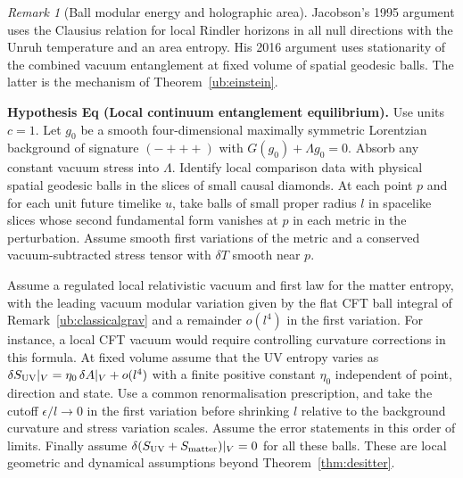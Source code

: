\documentclass[aps,pra,onecolumn,superscriptaddress,nofootinbib,10pt]{revtex4-2}
\theoremstyle{definition}
\theoremstyle{remark}
\newtheorem{remark}[theorem]{Remark}
\begin{document}
\begin{remark}[Ball modular energy and holographic area]
Jacobson's 1995 argument uses the Clausius relation for local Rindler
horizons in all null directions with the Unruh temperature and an
area entropy. His 2016 argument uses stationarity of the combined
vacuum entanglement at fixed volume of spatial geodesic balls.
The latter is the mechanism of Theorem~\ref{ub:einstein}.
\cite{n1-rt,ub:hrt,ub:flm,ub:faulkner,n1-jacobson,ub:jac16}
\end{remark}

\smallskip\noindent\textbf{Hypothesis Eq (Local continuum entanglement equilibrium).}\label{hyp:Eq}  Use units $c=1$. Let $g_0$ be a smooth four-dimensional maximally
symmetric Lorentzian background of signature $(-+++)$ with
$G(g_0)+\Lambda g_0=0$. Absorb any constant vacuum stress into
$\Lambda$. Identify local comparison data with physical spatial
geodesic balls in the slices of small causal diamonds. At each point
$p$ and for each unit future timelike $u$, take balls of small
proper radius $l$ in spacelike slices whose second fundamental form
vanishes at $p$ in each metric in the perturbation. Assume smooth
first variations of the metric and a conserved vacuum-subtracted
stress tensor with $\delta T$ smooth near $p$.

Assume a regulated local relativistic vacuum and first law for the
matter entropy, with the leading vacuum modular variation given by the
flat CFT ball integral of Remark~\ref{ub:classicalgrav} and a
remainder $o(l^4)$ in the first variation. For instance, a local CFT
vacuum would require controlling curvature corrections in this
formula. At fixed volume assume that the UV entropy varies as
$\delta S_{\rm UV}|_V=\eta_0\,\delta A|_V+o(l^4)$ with a finite
positive constant $\eta_0$ independent of point, direction and state.
Use a common renormalisation prescription, and take the cutoff
$\epsilon/l\to0$ in the first variation before shrinking $l$ relative
to the background curvature and stress variation scales.
Assume the error statements in this order of limits. Finally assume
$\delta(S_{\rm UV}+S_{\rm matter})|_V=0$ for all these balls.
These are local geometric and dynamical assumptions beyond Theorem~\ref{thm:desitter}.
\end{document}
